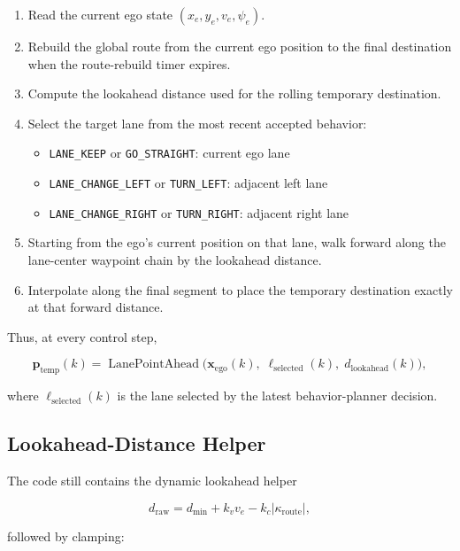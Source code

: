 \documentclass[11pt]{article}
\begin{document}
\begin{enumerate}
    \item Read the current ego state $(x_e, y_e, v_e, \psi_e)$.
    \item Rebuild the global route from the current ego position to the final
    destination when the route-rebuild timer expires.
    \item Compute the lookahead distance used for the rolling temporary
    destination.
    \item Select the target lane from the most recent accepted behavior:
    \begin{itemize}
        \item \texttt{LANE\_KEEP} or \texttt{GO\_STRAIGHT}: current ego lane
        \item \texttt{LANE\_CHANGE\_LEFT} or \texttt{TURN\_LEFT}: adjacent left lane
        \item \texttt{LANE\_CHANGE\_RIGHT} or \texttt{TURN\_RIGHT}: adjacent right lane
    \end{itemize}
    \item Starting from the ego's current position on that lane, walk forward
    along the lane-center waypoint chain by the lookahead distance.
    \item Interpolate along the final segment to place the temporary
    destination exactly at that forward distance.
\end{enumerate}

Thus, at every control step,

\begin{equation}
\mathbf{p}_{\mathrm{temp}}(k)
=
\operatorname{LanePointAhead}
\Big(
\mathbf{x}_{\mathrm{ego}}(k),\;
\ell_{\mathrm{selected}}(k),\;
d_{\mathrm{lookahead}}(k)
\Big),
\end{equation}

where $\ell_{\mathrm{selected}}(k)$ is the lane selected by the latest
behavior-planner decision.

\subsection{Lookahead-Distance Helper}

The code still contains the dynamic lookahead helper

\begin{equation}
d_{\mathrm{raw}} = d_{\min} + k_v v_e - k_c |\kappa_{\mathrm{route}}|,
\end{equation}

followed by clamping:
\end{document}
